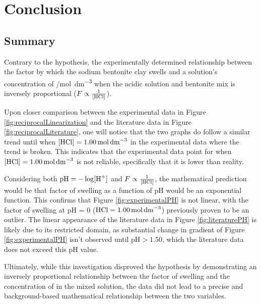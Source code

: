 \documentclass[11pt, letterpaper]{article}
\begin{document}
\section{Conclusion}

\subsection{Summary}

Contrary to the hypothesis, the experimentally determined relationship
between the factor by which the sodium bentonite clay swells
and a solution's concentration of  /\unit{mol.dm^{-3}}
when the acidic solution and bentonite mix is inversely proportional
(\(F \propto \frac{1}{\ce{[HCl]}}\)).


Upon closer comparison between the experimental data in Figure \ref*{fig:reciprocalLinearization}
and the literature data in Figure \ref*{fig:reciprocalLiterature},
one will notice that the two graphs do follow a similar trend
until when \(\ce{[HCl]} = \SI{1.00}{mol.dm^{-3}}\) in the
experimental data where the trend is broken. This indicates
that the experimental data point for when \(\ce{[HCl]} = \SI{1.00}{mol.dm^{-3}}\)
is not reliable, specifically that it is lower than reality.

Considering both \(\text{pH} = -\log [\ce{H+}]\) and \(F \propto \frac{1}{\ce{[HCl]}}\),
the mathematical prediction would be that factor of swelling as a
function of pH would be an exponential function. This confirms
that Figure \ref*{fig:experimentalPH} is not linear, with
the factor of swelling at pH = 0 (\(\ce{HCl} = \SI{1.00}{mol.dm^{-3}}\))
previously proven to be an outlier. The linear appearance of the literature
data in Figure \ref*{fig:literaturePH} is likely due to its
restricted domain, as substantial change in gradient
of Figure \ref*{fig:experimentalPH} isn't observed
until \(\text{pH} > 1.50\), which the literature data does not
exceed this pH value.

Ultimately, while this investigation disproved the hypothesis
by demonstrating an inversely proportional relationship between
the factor of swelling and the concentration of  in the
mixed solution, the data did not lead to a precise and
background-based mathematical relationship between the
two variables.
\end{document}
